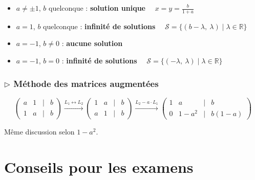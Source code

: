 \documentclass[12pt,a4paper]{article}
\begin{document}
\begin{solbox}
\begin{itemize}
  \item $a \neq \pm 1$, $b$ quelconque : \textbf{solution unique} $\displaystyle\quad x = y = \frac{b}{1+a}$
  \item $a = 1$, $b$ quelconque : \textbf{infinité de solutions} $\quad \mathcal{S} = \{(b-\lambda,\ \lambda) \mid \lambda \in \mathbb{R}\}$
  \item $a = -1$, $b \neq 0$ : \textbf{aucune solution}
  \item $a = -1$, $b = 0$ : \textbf{infinité de solutions} $\quad \mathcal{S} = \{(-\lambda,\ \lambda) \mid \lambda \in \mathbb{R}\}$
\end{itemize}
\end{solbox}

\subsubsection*{$\triangleright$ Méthode des matrices augmentées}

\[
\begin{pmatrix}
a & 1 & \mid & b \\
1 & a & \mid & b
\end{pmatrix}
\xrightarrow{L_1 \leftrightarrow L_2}
\begin{pmatrix}
1 & a & \mid & b \\
a & 1 & \mid & b
\end{pmatrix}
\xrightarrow{L_2 - a \cdot L_1}
\begin{pmatrix}
1 & a & \mid & b \\
0 & 1-a^2 & \mid & b(1-a)
\end{pmatrix}
\]

Même discussion selon $1-a^2$.

\section*{Conseils pour les examens}
\end{document}
